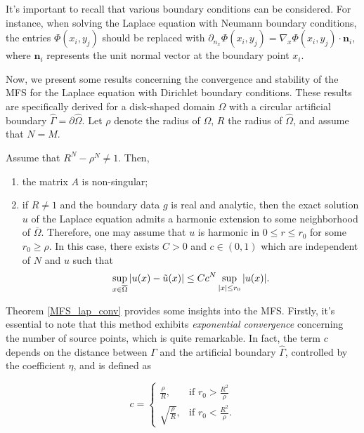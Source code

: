 It's important to recall that various boundary conditions can be considered. For instance, when solving the Laplace equation with Neumann boundary conditions, the entries \(\Phi(x_i,y_j)\) should be replaced with \(\partial_{n_x}\Phi(x_i,y_j) = \nabla_x\Phi(x_i,y_j)\cdot \mathbf{n}_i\), where \(\mathbf{n}_i\) represents the unit normal vector at the boundary point \(x_i\).

Now, we present some results concerning the convergence and stability of the \ac{MFS} for the Laplace equation with Dirichlet boundary conditions. These results are specifically derived for a disk-shaped domain \(\Omega\) with a circular artificial boundary \(\hat{\Gamma} = \partial \hat{\Omega}\). Let \(\rho\) denote the radius of \(\Omega\), \(R\) the radius of \(\hat{\Omega}\), and assume that \(N=M\).

\begin{theorem}\label{MFS_lap_conv}
    Assume that \(R^N - \rho^N \neq 1\). Then,
    \begin{enumerate}
        \item the matrix \(A\) is non-singular;
        \item if \(R \neq 1\) and the boundary data \(g\) is real and analytic, then the exact solution \(u\) of the Laplace equation admits a harmonic extension to some neighborhood of \(\overline{\Omega}\). Therefore, one may assume that \(u\) is harmonic in \(0 \leq r \leq r_0\) for some \(r_0 \geq \rho\). In this case, there exists \(C > 0\) and \(c \in (0, 1)\) which are independent of \(N\) and \(u\) such that
        \[
            \sup_{\substack{x \in \overline{\Omega}}} \abs{u(x) - \tilde{u}(x)} \leq C c^N \sup_{\substack{\abs{x}\leq r_0}}\abs{u(x)}.
        \]
    \end{enumerate}
\end{theorem}

Theorem \ref{MFS_lap_conv} provides some insights into the \ac{MFS}. Firstly, it's essential to note that this method exhibits \textit{exponential convergence} concerning the number of source points, which is quite remarkable. In fact, the term \(c\) depends on the distance between \(\Gamma\) and the artificial boundary \(\hat{\Gamma}\), controlled by the coefficient \(\eta\), and is defined as

\[
c = \begin{cases}
        \frac{\rho}{R}, & \text{if } r_0 > \frac{R^2}{\rho}\\
        \sqrt{\frac{\rho}{R}}, & \text{if } r_0 < \frac{R^2}{\rho}.
    \end{cases}
\]

